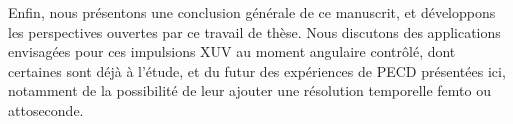 Enfin, nous présentons une conclusion générale de ce manuscrit, et développons les perspectives ouvertes par ce travail de thèse. Nous discutons des applications envisagées pour ces impulsions XUV au moment angulaire contrôlé, dont certaines sont déjà à l'étude, et du futur des expériences de PECD présentées ici, notamment de la possibilité de leur ajouter une résolution temporelle femto ou attoseconde. 
